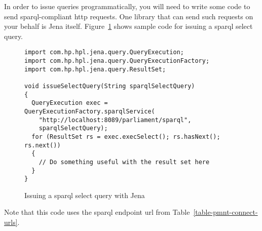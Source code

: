In order to issue queries programmatically, you will need to write some code to send \ac{sparql}-compliant \ac{http} requests.  One library that can send such requests on your behalf is Jena itself.  Figure~\ref{figure-sparql-select-query-with-jena} shows sample code for issuing a \ac{sparql} select query.
\begin{figure}[htbp]
	\footnotesize
	\begin{verbatim}
import com.hp.hpl.jena.query.QueryExecution;
import com.hp.hpl.jena.query.QueryExecutionFactory;
import com.hp.hpl.jena.query.ResultSet;

void issueSelectQuery(String sparqlSelectQuery)
{
  QueryExecution exec = QueryExecutionFactory.sparqlService(
    "http://localhost:8089/parliament/sparql",
    sparqlSelectQuery);
  for (ResultSet rs = exec.execSelect(); rs.hasNext(); rs.next())
  {
    // Do something useful with the result set here
  }
}
	\end{verbatim}
	\caption{Issuing a \acs*{sparql} select query with Jena}
	\label{figure-sparql-select-query-with-jena}
\end{figure}
Note that this code uses the \ac{sparql} endpoint \ac{url} from Table~\ref{table-pmnt-connect-urls}.


